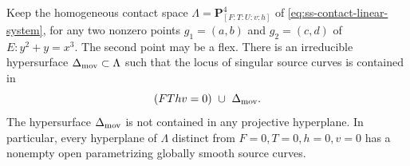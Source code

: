 \begin{lemma}
\label{lem:DE-A4-contact-discriminant-span}
Keep the homogeneous contact space $\Lambda=\mathbf P^4_{[F:T:U:v:h]}$
of \eqref{eq:ss-contact-linear-system}, for any two nonzero points
$g_1=(a,b)$ and $g_2=(c,d)$ of $E:y^2+y=x^3$.
The second point may be a flex.
There is an irreducible hypersurface
$\Delta_{\rm mov}\subset\Lambda$ such that the locus of singular
source curves is contained in
\[
              (FThv=0)\ \cup\ \Delta_{\rm mov}.
\]
The hypersurface $\Delta_{\rm mov}$ is not contained in any
projective hyperplane.  In particular, every hyperplane of
$\Lambda$ distinct from $F=0,T=0,h=0,v=0$ has a nonempty open
parametrizing globally smooth source curves.
\end{lemma}
